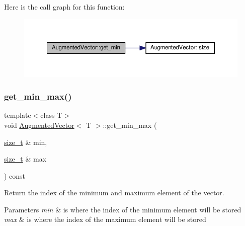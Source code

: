Here is the call graph for this function\+:
\nopagebreak
\begin{figure}[H]
\begin{center}
\leavevmode
\includegraphics[width=350pt]{d1/d7a/classAugmentedVector_a1c29ec0db3858779d9b83f15c8c1d302_cgraph}
\end{center}
\end{figure}
\mbox{\label{classAugmentedVector_acf2a88cd2abcdf96eed0277e9cfbd241}} 
\subsubsection{\texorpdfstring{get\+\_\+min\+\_\+max()}{get\_min\_max()}}
{\footnotesize\ttfamily template$<$class T$>$ \\
void \hyperlink{classAugmentedVector}{Augmented\+Vector}$<$ T $>$\+::get\+\_\+min\+\_\+max (\begin{DoxyParamCaption}\item[{\hyperlink{tutorial__fpt__2017_2intro_2sixth_2test_8c_a7c94ea6f8948649f8d181ae55911eeaf}{size\+\_\+t} \&}]{min,  }\item[{\hyperlink{tutorial__fpt__2017_2intro_2sixth_2test_8c_a7c94ea6f8948649f8d181ae55911eeaf}{size\+\_\+t} \&}]{max }\end{DoxyParamCaption}) const\hspace{0.3cm}{\ttfamily [inline]}}



Return the index of the minimum and maximum element of the vector. 


\begin{DoxyParams}{Parameters}
{\em min} & is where the index of the minimum element will be stored \\
\hline
{\em max} & is where the index of the maximum element will be stored \\
\hline
\end{DoxyParams}



